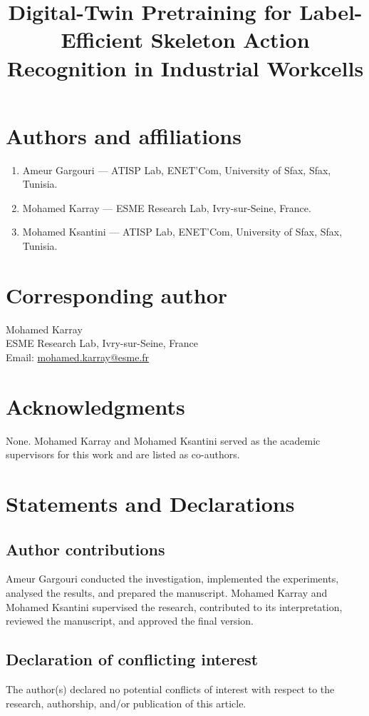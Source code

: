 \documentclass[12pt]{article}
\title{Digital-Twin Pretraining for Label-Efficient Skeleton Action Recognition in Industrial Workcells}
\author{}
\date{}
\begin{document}
\maketitle

\section*{Authors and affiliations}

\begin{enumerate}[leftmargin=*]
      \item Ameur Gargouri --- ATISP Lab, ENET'Com, University of Sfax, Sfax,
            Tunisia.
      \item Mohamed Karray --- ESME Research Lab, Ivry-sur-Seine, France.
      \item Mohamed Ksantini --- ATISP Lab, ENET'Com, University of Sfax, Sfax,
            Tunisia.
\end{enumerate}

\section*{Corresponding author}

Mohamed Karray\\
ESME Research Lab, Ivry-sur-Seine, France\\
Email: \href{mailto:mohamed.karray@esme.fr}{mohamed.karray@esme.fr}\\


\section*{Acknowledgments}

None. Mohamed Karray and Mohamed Ksantini served as the academic supervisors
for this work and are listed as co-authors.

\section*{Statements and Declarations}

\subsection*{Author contributions}

Ameur Gargouri conducted the investigation, implemented the experiments,
analysed the results, and prepared the manuscript. Mohamed Karray and Mohamed
Ksantini supervised the research, contributed to its interpretation, reviewed
the manuscript, and approved the final version.

\subsection*{Declaration of conflicting interest}

The author(s) declared no potential conflicts of interest with respect to the
research, authorship, and/or publication of this article.
\end{document}
